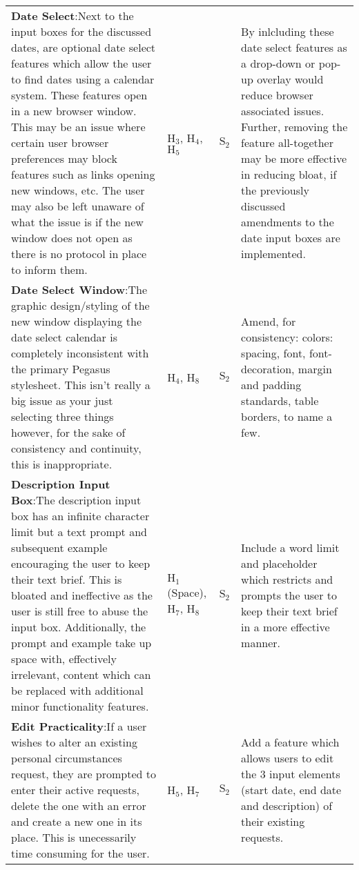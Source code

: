 \documentclass[11pt, english]{article}
\begin{document}
\begin{center}
\begin{longtable}{p{7.5cm}p{0.5cm}p{0.5cm}p{4cm}}
		\textbf{Date Select}:\newline Next to the input boxes for the discussed dates, are optional date select features which allow the user to find dates using a calendar system. These features open in a new browser window. This may be an issue where certain user browser preferences may block features such as links opening new windows, etc. The user may also be left unaware of what the issue is if the new window does not open as there is no protocol in place to inform them. & $\mathrm{H_{3}}$, $\mathrm{H_{4}}$, $\mathrm{H_{5}}$ & $\mathrm{S_{2}}$ & By inlcluding these date select features as a drop-down or pop-up overlay would reduce browser associated issues. Further, removing the feature all-together may be more effective in reducing bloat, if the previously discussed amendments to the date input boxes are implemented.\\
		\textbf{Date Select Window}:\newline The graphic design/styling of the new window displaying the date select calendar is completely inconsistent with the primary Pegasus stylesheet. This isn't really a big issue as your just selecting three things however, for the sake of consistency and continuity, this is inappropriate. & $\mathrm{H_{4}}$, $\mathrm{H_{8}}$ & $\mathrm{S_{2}}$ & Amend, for consistency: colors: spacing, font, font-decoration, margin and padding standards, table borders, to name a few.\\
		\textbf{Description Input Box}:\newline The description input box has an infinite character limit but a text prompt and subsequent example encouraging the user to keep their text brief. This is bloated and ineffective as the user is still free to abuse the input box. Additionally, the prompt and example take up space with, effectively irrelevant, content which can be replaced with additional minor functionality features. & $\mathrm{H_{1}}$ (Space), $\mathrm{H_{7}}$, $\mathrm{H_{8}}$ & $\mathrm{S_{2}}$ & Include a word limit and placeholder which restricts and prompts the user to keep their text brief in a more effective manner.\\
		\textbf{Edit Practicality}:\newline If a user wishes to alter an existing personal circumstances request, they are prompted to enter their active requests, delete the one with an error and create a new one in its place. This is unecessarily time consuming for the user. & $\mathrm{H_{5}}$, $\mathrm{H_{7}}$ & $\mathrm{S_{2}}$ & Add a feature which allows users to edit the 3 input elements (start date, end date and description) of their existing requests.\\

\end{longtable}
\end{center}
\end{document}
